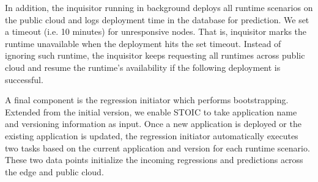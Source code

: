 In addition, the inquisitor running in background deploys all runtime
scenarios on the public cloud and logs deployment time in the database for
prediction. We set a timeout (i.e. 10 minutes) for unresponsive nodes. That
is, inquisitor marks the runtime unavailable when the deployment hits the set
timeout. Instead of ignoring such runtime, the inquisitor keeps requesting all
runtimes across public cloud and resume the runtime's availability if the
following deployment is successful.

A final component is the regression initiator which performs bootstrapping.
Extended from the initial version, we enable STOIC to take application name
and versioning information as input. Once a new application is deployed or the
existing application is updated, the regression initiator automatically
executes two tasks based on the current application and version for each
runtime scenario. These two data points initialize the incoming regressions
and predictions across the edge and public cloud.

